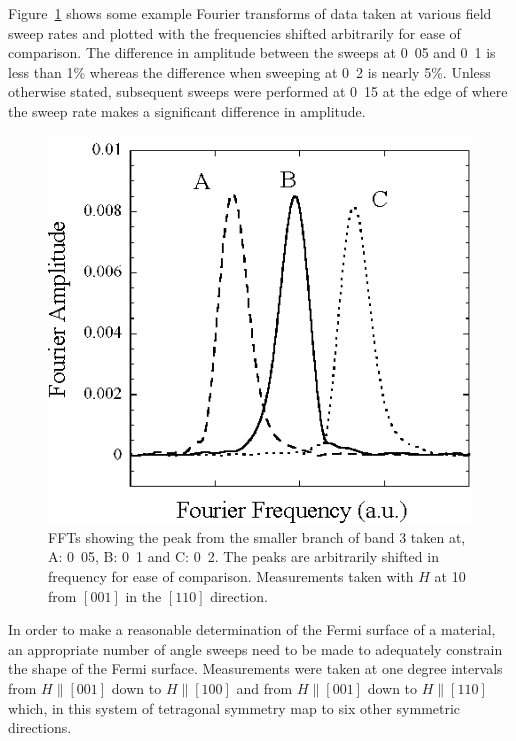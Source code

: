 Figure~\ref{Fig:ResD:ComparisonSweepRates} shows some example Fourier transforms of data taken at various field sweep rates and plotted with the frequencies shifted arbitrarily for ease of comparison. The difference in amplitude between the sweeps at \unit{0.05}{\tesla\reciprocal\minute} and \unit{0.1}{\tesla\reciprocal\minute} is less than \unit{1}{\%} whereas the difference when sweeping at \unit{0.2}{\tesla\reciprocal\minute} is nearly \unit{5}{\%}. Unless otherwise stated, subsequent sweeps were performed at \unit{0.15}{\tesla\reciprocal\minute} at the edge of where the sweep rate makes a significant difference in amplitude.

\begin{figure}[htbp]
    \begin{center}
        \includegraphics[scale=0.9]{Chapter-dHvABaFe2P2/Figures/AngleDepMeasurements/SweepRateComparison/SweepRateComparison}
        \caption{\acp{FFT} showing the peak from the smaller branch of band $3$ taken at, A: \unit{0.05}{\tesla\reciprocal\minute}, B: \unit{0.1}{\tesla\reciprocal\minute} and C: \unit{0.2}{\tesla\reciprocal\minute}. The peaks are arbitrarily shifted in frequency for ease of comparison. Measurements taken with $H$ at \unit{10}{\degree} from $[001]$ in the $[110]$ direction.}
        \label{Fig:ResD:ComparisonSweepRates}
    \end{center}
\end{figure}

In order to make a reasonable determination of the Fermi surface of a material, an appropriate number of angle sweeps need to be made to adequately constrain the shape of the Fermi surface. Measurements were taken at one degree intervals from $H\parallel[001]$ down to $H\parallel[100]$ and from $H\parallel[001]$ down to $H\parallel[110]$ which, in this system of tetragonal symmetry map to six other symmetric directions.

